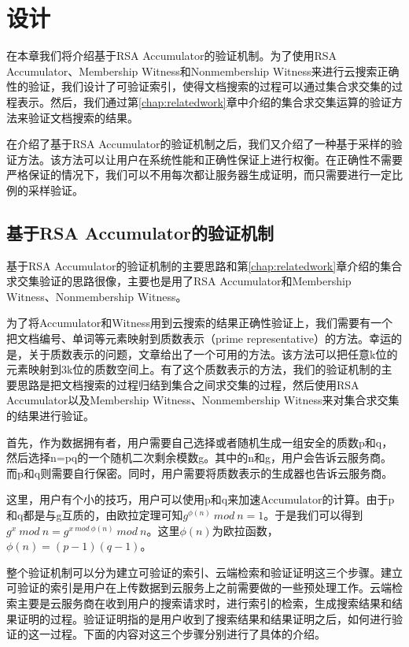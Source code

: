 \chapter{设计}
\label{chap:design}

在本章我们将介绍基于RSA Accumulator的验证机制。为了使用RSA Accumulator、Membership Witness和Nonmembership Witness来进行云搜索正确性的验证，我们设计了可验证索引，使得文档搜索的过程可以通过集合求交集的过程表示。然后，我们通过第\ref{chap:relatedwork}章中介绍的集合求交集运算的验证方法来验证文档搜索的结果。

在介绍了基于RSA Accumulator的验证机制之后，我们又介绍了一种基于采样的验证方法。该方法可以让用户在系统性能和正确性保证上进行权衡。在正确性不需要严格保证的情况下，我们可以不用每次都让服务器生成证明，而只需要进行一定比例的采样验证。

\section{基于RSA Accumulator的验证机制}
基于RSA Accumulator的验证机制的主要思路和第\ref{chap:relatedwork}章介绍的集合求交集验证的思路很像，主要也是用了RSA Accumulator和Membership Witness、Nonmembership Witness。

为了将Accumulator和Witness用到云搜索的结果正确性验证上，我们需要有一个把文档编号、单词等元素映射到质数表示（prime representative）的方法。幸运的是，关于质数表示的问题，文章\cite{gennaro1999secure,goodrich2002efficient}给出了一个可用的方法。该方法可以把任意k位的元素映射到3k位的质数空间上。有了这个质数表示的方法，我们的验证机制的主要思路是把文档搜索的过程归结到集合之间求交集的过程，然后使用RSA Accumulator以及Membership Witness、Nonmembership Witness来对集合求交集的结果进行验证。

首先，作为数据拥有者，用户需要自己选择或者随机生成一组安全的质数p和q，然后选择n=pq的一个随机二次剩余模数g。其中的n和g，用户会告诉云服务商。而p和q则需要自行保密。同时，用户需要将质数表示的生成器也告诉云服务商。

这里，用户有个小的技巧，用户可以使用p和q来加速Accumulator的计算。由于p和q都是与g互质的，由欧拉定理可知$g^{\phi(n)}\ mod\ n = 1$。于是我们可以得到$g^x\ mod\ n  = g^{x\ mod\ \phi(n)}\ mod\ n$。这里$\phi(n)$为欧拉函数，$\phi(n) = (p-1)(q-1)$。

整个验证机制可以分为建立可验证的索引、云端检索和验证证明这三个步骤。建立可验证的索引是用户在上传数据到云服务上之前需要做的一些预处理工作。云端检索主要是云服务商在收到用户的搜索请求时，进行索引的检索，生成搜索结果和结果证明的过程。验证证明指的是用户收到了搜索结果和结果证明之后，如何进行验证的这一过程。下面的内容对这三个步骤分别进行了具体的介绍。

